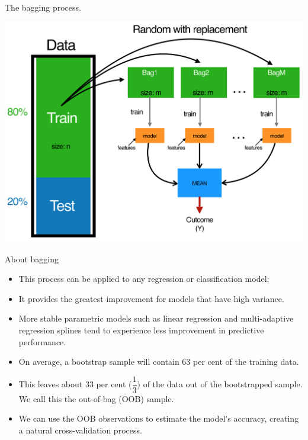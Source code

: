 \documentclass[
  10pt,
  ignorenonframetext,
]{beamer}
\providecommand{\tightlist}{%
  \setlength{\itemsep}{0pt}\setlength{\parskip}{0pt}}
\begin{document}
\begin{frame}{The bagging process.}
\protect\hypertarget{the-bagging-process.}{}

\includegraphics[width=\textwidth,height=0.7\textheight]{figure/bagging3.png}

\end{frame}

\begin{frame}{About bagging}
\protect\hypertarget{about-bagging}{}

\begin{itemize}
\tightlist
\item
  This process can be applied to any regression or classification model;
\item
  It provides the greatest improvement for models that have high
  variance.
\item
  More stable parametric models such as linear regression and
  multi-adaptive regression splines tend to experience less improvement
  in predictive performance.
\item
  On average, a bootstrap sample will contain 63 per cent of the
  training data.
\item
  This leaves about 33 per cent (\(\dfrac{1}{3}\)) of the data out of
  the bootstrapped sample. We call this the out-of-bag (OOB) sample.
\item
  We can use the OOB observations to estimate the model's accuracy,
  creating a natural cross-validation process.
\end{itemize}

\end{frame}
\end{document}
